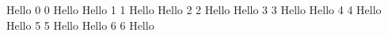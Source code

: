 \documentclass[12pt]{article}
\begin{document}
Hello 0
0 Hello
\newpage
Hello 1
1 Hello
\newpage
Hello 2
2 Hello
\newpage
Hello 3
3 Hello
\newpage
Hello 4
4 Hello
\newpage
Hello 5
5 Hello
\newpage
Hello 6
6 Hello
\newpage
\end{document}
